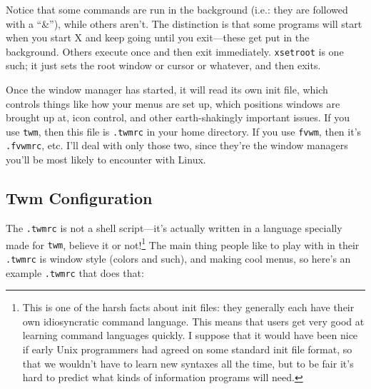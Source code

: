 
        Notice that some commands are run in the background (i.e.:
they are followed with a ``\&''), while others aren't.  The
distinction is that some programs will start when you start X
and keep going until you exit---these get put in the background.
Others execute once and then exit immediately. {\tt xsetroot} is one
such; it just sets the root window or cursor or whatever, and then
exits.

        Once the window manager has started, it will read its own init
file, which controls things like how your menus are set up, which
positions windows are brought up at, icon control, and other
earth-shakingly important issues.  If you use {\tt twm}, then this
file is {\tt .twmrc} in your home directory.  If you use {\tt fvwm},
then it's {\tt .fvwmrc}, etc.  I'll deal with only those two, since
they're the window managers you'll be most likely to encounter with
Linux.

\subsection{Twm Configuration}\label{twm-config-section}

The {\tt .twmrc} is not a shell script---it's actually written in a
language specially made for {\tt twm}, believe it or
not!\footnote{This is one of the harsh facts about init files: they
  generally each have their own idiosyncratic command language.  This
  means that users get very good at learning command languages
  quickly.  I suppose that it would have been nice if early Unix
  programmers had agreed on some standard init file format, so that we
  wouldn't have to learn new syntaxes all the time, but to be fair
  it's hard to predict what kinds of information programs will need.}
The main thing people like to play with in their {\tt .twmrc} is
window style (colors and such), and making cool menus, so here's an
example {\tt .twmrc} that does that:

